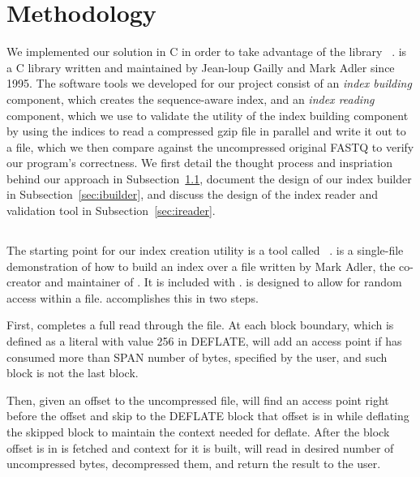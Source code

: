 \section{Methodology}
We implemented our solution in C in order to take advantage of the library
\zlib~\cite{zlib}. \zlib is a C library written and maintained by Jean-loup
Gailly and Mark Adler since 1995.
The software tools we developed for our project consist of an \emph{index
building} component, which creates the sequence-aware \gzip index, and an
\emph{index reading} component, which we use to validate the utility of the
index building component by using the indices to read a compressed gzip file in
parallel and write it out to a file, which we then compare against the
uncompressed original FASTQ to verify our program's correctness. We first detail
the thought process and inspriation behind our approach in
Subsection~\ref{sec:zran}, document the design of our index builder in
Subsection~\ref{sec:ibuilder}, and discuss the design of the index reader and validation
tool in Subsection~\ref{sec:ireader}.

\subsection{\zran}
\label{sec:zran}

The starting point for our index creation utility is a tool called
\zran~\cite{zran}. \zran
is a single-file demonstration of how to build an index over a \gzip file
written by Mark Adler, the co-creator and maintainer of \zlib. It is included with
\zlib. \zran is designed to allow for random access within a \gzip file. \zran
accomplishes this in two steps. 

First, \zran completes a full read through the \gzip file. At each \gzip block boundary, which is defined as a literal with value 256 in DEFLATE, \zran will add an access point if \zran has consumed more than SPAN number of bytes, specified by the user, and such block is not the last block. 

Then, given an offset to the uncompressed file, \zran will find an access point right before the offset and skip to the DEFLATE block that offset is in while deflating the skipped block to maintain the context needed for deflate. After the block offset is in is fetched and context for it is built, \zran will read in desired number of uncompressed bytes, decompressed them, and return the result to the user. 

